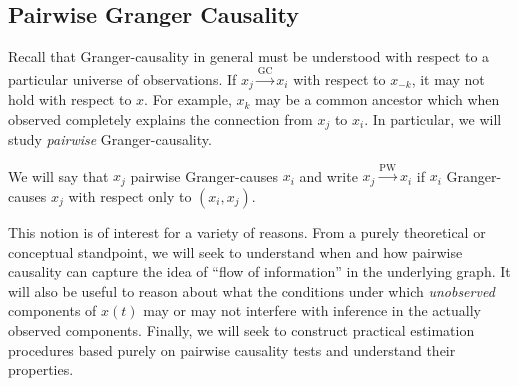 \documentclass[12pt]{article}
\def\gc{\overset{\text{GC}}{\rightarrow}}  %
\def\pwgc{\overset{\text{PW}}{\rightarrow}}  %
\def\te{\overset{\mathcal{T}}{\rightarrow}}  %
\begin{document}




\subsection{Pairwise Granger Causality}
\label{sec:pwgc}
Recall that Granger-causality in general must be understood with
respect to a particular universe of observations.  If $x_j \gc x_i$
with respect to $x_{-k}$, it may not hold with respect to $x$.  For
example, $x_k$ may be a common ancestor which when observed completely
explains the connection from $x_j$ to $x_i$.  In particular, we will
study \textit{pairwise} Granger-causality.

\begin{definition}
  We will say that $x_j$ pairwise Granger-causes $x_i$ and write
  $x_j \pwgc x_i$ if $x_i$ Granger-causes $x_j$ with respect only to
  $(x_i, x_j)$.
\end{definition}

This notion is of interest for a variety of reasons.  From a purely
theoretical or conceptual standpoint, we will seek to understand when
and how pairwise causality can capture the idea of ``flow of
information'' in the underlying graph.  It will also be useful to
reason about what the conditions under which \textit{unobserved}
components of $x(t)$ may or may not interfere with inference in the
actually observed components.  Finally, we will seek to construct
practical estimation procedures based purely on pairwise causality
tests and understand their properties.
\end{document}
